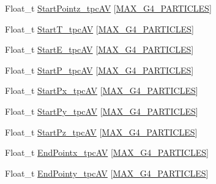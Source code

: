 \begin{DoxyCompactItemize}
\item 
Float\-\_\-t \hyperlink{classanatree_ad71b098c7d57e1af196dd8620c08b861}{Start\-Pointz\-\_\-tpc\-A\-V} \mbox{[}\hyperlink{anatree__core__v09410002__orig_8h_aa5cbba5cc53c011e88805f38503de894}{M\-A\-X\-\_\-\-G4\-\_\-\-P\-A\-R\-T\-I\-C\-L\-E\-S}\mbox{]}
\item 
Float\-\_\-t \hyperlink{classanatree_a960484efdcfc749574bb4ecf7ff6954c}{Start\-T\-\_\-tpc\-A\-V} \mbox{[}\hyperlink{anatree__core__v09410002__orig_8h_aa5cbba5cc53c011e88805f38503de894}{M\-A\-X\-\_\-\-G4\-\_\-\-P\-A\-R\-T\-I\-C\-L\-E\-S}\mbox{]}
\item 
Float\-\_\-t \hyperlink{classanatree_a1a2088c9d8cade01f5dd8bb10d1f333c}{Start\-E\-\_\-tpc\-A\-V} \mbox{[}\hyperlink{anatree__core__v09410002__orig_8h_aa5cbba5cc53c011e88805f38503de894}{M\-A\-X\-\_\-\-G4\-\_\-\-P\-A\-R\-T\-I\-C\-L\-E\-S}\mbox{]}
\item 
Float\-\_\-t \hyperlink{classanatree_a32c58d98d48ac9acd69666d3699de6ba}{Start\-P\-\_\-tpc\-A\-V} \mbox{[}\hyperlink{anatree__core__v09410002__orig_8h_aa5cbba5cc53c011e88805f38503de894}{M\-A\-X\-\_\-\-G4\-\_\-\-P\-A\-R\-T\-I\-C\-L\-E\-S}\mbox{]}
\item 
Float\-\_\-t \hyperlink{classanatree_a424d9106c9827a8829e5d001726d2d2c}{Start\-Px\-\_\-tpc\-A\-V} \mbox{[}\hyperlink{anatree__core__v09410002__orig_8h_aa5cbba5cc53c011e88805f38503de894}{M\-A\-X\-\_\-\-G4\-\_\-\-P\-A\-R\-T\-I\-C\-L\-E\-S}\mbox{]}
\item 
Float\-\_\-t \hyperlink{classanatree_adbef8aabd6ce8b49f666f7857aa07530}{Start\-Py\-\_\-tpc\-A\-V} \mbox{[}\hyperlink{anatree__core__v09410002__orig_8h_aa5cbba5cc53c011e88805f38503de894}{M\-A\-X\-\_\-\-G4\-\_\-\-P\-A\-R\-T\-I\-C\-L\-E\-S}\mbox{]}
\item 
Float\-\_\-t \hyperlink{classanatree_a41bbac8dc4d0708fb0d79470eb4f08ac}{Start\-Pz\-\_\-tpc\-A\-V} \mbox{[}\hyperlink{anatree__core__v09410002__orig_8h_aa5cbba5cc53c011e88805f38503de894}{M\-A\-X\-\_\-\-G4\-\_\-\-P\-A\-R\-T\-I\-C\-L\-E\-S}\mbox{]}
\item 
Float\-\_\-t \hyperlink{classanatree_af869b7b410c8f9e23ea42a8e74650894}{End\-Pointx\-\_\-tpc\-A\-V} \mbox{[}\hyperlink{anatree__core__v09410002__orig_8h_aa5cbba5cc53c011e88805f38503de894}{M\-A\-X\-\_\-\-G4\-\_\-\-P\-A\-R\-T\-I\-C\-L\-E\-S}\mbox{]}
\item 
Float\-\_\-t \hyperlink{classanatree_aca35df4eeea9f585092b6744f93e62d6}{End\-Pointy\-\_\-tpc\-A\-V} \mbox{[}\hyperlink{anatree__core__v09410002__orig_8h_aa5cbba5cc53c011e88805f38503de894}{M\-A\-X\-\_\-\-G4\-\_\-\-P\-A\-R\-T\-I\-C\-L\-E\-S}\mbox{]}

\end{DoxyCompactItemize}
